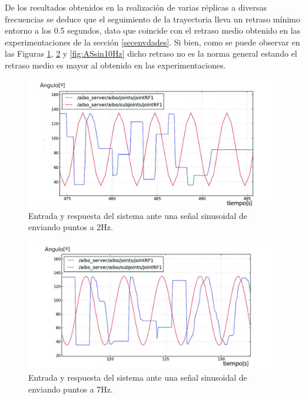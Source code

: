 \documentclass[12pt,a4paper,final,twoside]{book}
\begin{document}
De los resultados obtenidos en la realización de varias réplicas a diversas frecuencias se deduce que el seguimiento de la trayectoria lleva un retraso mínimo entorno a los 0.5 segundos, dato que coincide con el retraso medio obtenido en las experimentaciones de la sección \ref{secenvdades}. Si bien, como se puede observar en las Figuras \ref{fig:ASsin2Hz}, \ref{fig:ASsin7Hz} y \ref{fig:ASsin10Hz} 
dicho retraso no es la norma general estando el retraso medio es mayor al obtenido en las experimentaciones.
\begin{figure}[H]
	\centering
	    \includegraphics[scale=0.28]{images/10Ry2S.jpg}
 	\caption{Entrada y respuesta del sistema ante una señal sinusoidal de enviando puntos a 2Hz.}
  \label{fig:ASsin2Hz}
\end{figure}
\begin{figure}[H]
	\centering
    \includegraphics[scale=0.28]{images/10Ry7S.jpg}
 	\caption{Entrada y respuesta del sistema ante una señal sinusoidal de enviando puntos a 7Hz.}
  \label{fig:ASsin7Hz}
\end{figure}
\end{document}
